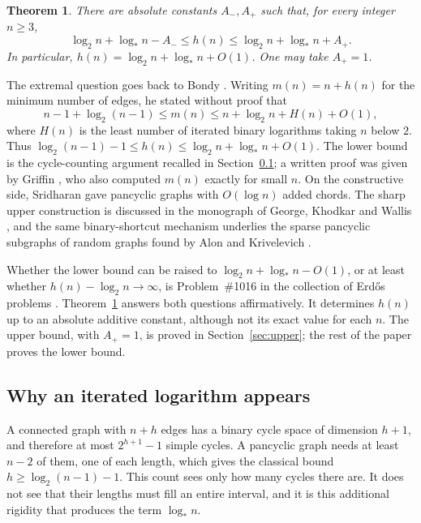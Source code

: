 \documentclass[11pt,a4paper]{article}
\numberwithin{equation}{section}
\newtheorem{theorem}{Theorem}[section]
\theoremstyle{definition}
\theoremstyle{remark}
\newcommand{\lstar}{\log_*}
\begin{document}
\begin{theorem}\label{thm:main}
There are absolute constants $A_-,A_+$ such that, for every integer $n\ge3$,
\[
 \log_2n+\lstar n-A_-\le h(n)\le\log_2n+\lstar n+A_+.
\]
In particular, $h(n)=\log_2n+\lstar n+O(1)$. One may take $A_+=1$.
\end{theorem}

The extremal question goes back to Bondy \cite{Bondy}. Writing $m(n)=n+h(n)$ for the minimum number of edges, he stated without proof that
\[
 n-1+\log_2(n-1)\le m(n)\le n+\log_2n+H(n)+O(1),
\]
where $H(n)$ is the least number of iterated binary logarithms taking $n$ below $2$. Thus $\log_2(n-1)-1\le h(n)\le\log_2n+\lstar n+O(1)$. The lower bound is the cycle-counting argument recalled in Section~\ref{sec:why-logstar}; a written proof was given by Griffin \cite{Griffin}, who also computed $m(n)$ exactly for small $n$. On the constructive side, Sridharan \cite{Sridharan} gave pancyclic graphs with $O(\log n)$ added chords. The sharp upper construction is discussed in the monograph of George, Khodkar and Wallis \cite{GKW}, and the same binary-shortcut mechanism underlies the sparse pancyclic subgraphs of random graphs found by Alon and Krivelevich \cite{AK}.

Whether the lower bound can be raised to $\log_2n+\lstar n-O(1)$, or at least whether $h(n)-\log_2n\to\infty$, is Problem~\#1016 in the collection of Erd\H{o}s problems \cite{ErdosProblems}. Theorem~\ref{thm:main} answers both questions affirmatively. It determines $h(n)$ up to an absolute additive constant, although not its exact value for each $n$. The upper bound, with $A_+=1$, is proved in Section~\ref{sec:upper}; the rest of the paper proves the lower bound.

\subsection{Why an iterated logarithm appears}\label{sec:why-logstar}
A connected graph with $n+h$ edges has a binary cycle space of dimension $h+1$, and therefore at most $2^{h+1}-1$ simple cycles. A pancyclic graph needs at least $n-2$ of them, one of each length, which gives the classical bound $h\ge\log_2(n-1)-1$. This count sees only how many cycles there are. It does not see that their lengths must fill an entire interval, and it is this additional rigidity that produces the term $\lstar n$.
\end{document}
